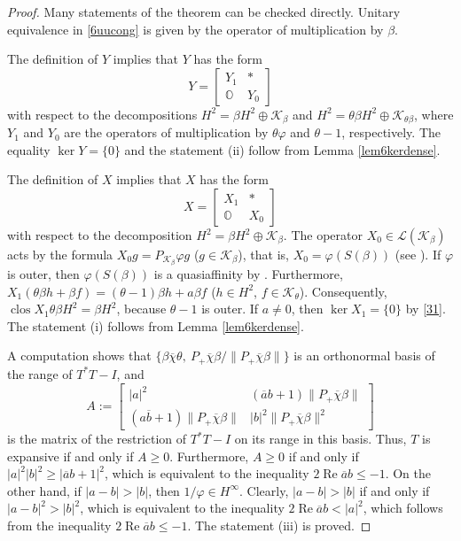 \documentclass[a4paper,oneside,11pt]{amsart}
\numberwithin{equation}{section}
\theoremstyle{plain}
\theoremstyle{definition}
\begin{document}
\begin{proof} Many statements of the theorem can be checked directly.  Unitary equivalence in \eqref{6uucong} is given by 
the operator of  multiplication by $\beta$. 

The definition of $Y$ implies that  $Y$ has the form 
\begin{equation*} Y=\left[\begin{matrix} Y_1 & * \\ \mathbb O  & Y_0\end{matrix}\right]
\end{equation*} with respect to the decompositions $H^2=\beta H^2\oplus \mathcal K_\beta$ and 
 $H^2=\theta\beta H^2\oplus \mathcal K_{\theta\beta}$, where $Y_1$ and $Y_0$ are the operators of multiplication by 
$\theta\varphi$ and $\theta-1$, respectively. The equality $\ker Y=\{0\}$ and the statement (ii)  follow from Lemma \ref{lem6kerdense}. 

The definition of $X$ implies that  $X$ has the form 
\begin{equation*} X=\left[\begin{matrix} X_1 & * \\ \mathbb O  & X_0\end{matrix}\right]
\end{equation*} with respect to the decomposition
$H^2=\beta H^2\oplus \mathcal K_\beta$. The operator  $X_0\in\mathcal L(\mathcal K_\beta)$ acts by the formula 
 $X_0g=P_{\mathcal K_\beta}\varphi g$ ($g\in\mathcal K_\beta$), that is, $X_0=\varphi(S(\beta))$ 
(see {\cite[Theorem III.2.1]{nfbk}}). 
If $\varphi$ is outer, then $\varphi(S(\beta))$ is a quasiaffinity by {\cite[Prop. III.3.1]{nfbk}}. 
Furthermore, $X_1(\theta\beta h+\beta f)=(\theta-1)\beta h+a\beta f$ ($h\in H^2$, $ f\in\mathcal K_\theta$). Consequently, 
$\operatorname{clos}X_1\theta\beta H^2=\beta H^2$, because $\theta-1$ is outer. 
If $a\neq 0$, then $\ker X_1=\{0\}$ by \eqref{31}. The statement (i) follows from Lemma \ref{lem6kerdense}. 

A computation shows that $\{\beta\overline \chi\theta, \ P_+\overline \chi\beta/\|P_+\overline \chi\beta\|\}$ is an orthonormal basis of the  
range of $T^*T-I$, and 
\begin{equation*} A:=\left[\begin{matrix}|a|^2 & (\overline ab+1)\|P_+\overline \chi\beta\|\\
(a\overline b+1)\|P_+\overline \chi\beta\| & |b|^2\|P_+\overline \chi\beta\|^2\end{matrix}\right]
\end{equation*}
 is the matrix of the restriction of $T^*T-I$ on its range in this basis.   Thus, $T$ is expansive if and only if $A\geq 0$. 
Furthermore,  $A\geq 0$ if and only if $|a|^2|b|^2\geq |\overline ab+1|^2$,  
which is equivalent to the inequality $2\operatorname{Re}\overline ab\leq -1$. 
On the other hand, if $|a-b|>|b|$, then  $1/\varphi\in H^\infty$. Clearly, $|a-b|>|b|$ if and only if $|a-b|^2>|b|^2$, 
which is equivalent to the inequality $2\operatorname{Re}\overline ab< |a|^2$, which follows 
from the inequality $2\operatorname{Re}\overline ab\leq -1$.  
The statement (iii) is proved.
\end{proof}
\end{document}
